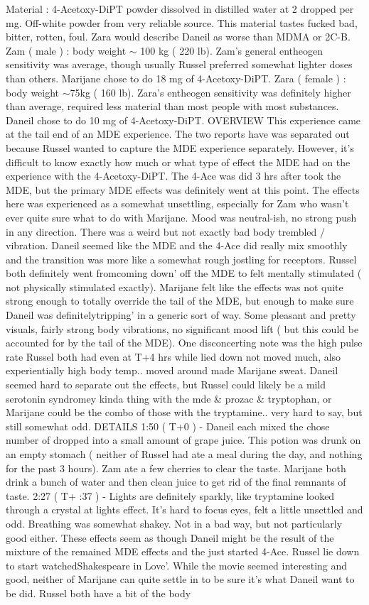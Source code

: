 \documentclass[12pt]{book}
\begin{document}
Material : 4-Acetoxy-DiPT powder dissolved in distilled water at 2 dropped per mg. Off-white powder from very reliable source. This material tastes fucked bad, bitter, rotten, foul. Zara would describe Daneil as worse than MDMA or 2C-B. Zam ( male ) : body weight $\sim$ 100 kg ( 220 lb). Zam's general entheogen sensitivity was average, though usually Russel preferred somewhat lighter doses than others. Marijane chose to do 18 mg of 4-Acetoxy-DiPT. Zara ( female ) : body weight $\sim$75kg ( 160 lb). Zara's entheogen sensitivity was definitely higher than average, required less material than most people with most substances. Daneil chose to do 10 mg of 4-Acetoxy-DiPT. OVERVIEW This experience came at the tail end of an MDE experience. The two reports have was separated out because Russel wanted to capture the MDE experience separately. However, it's difficult to know exactly how much or what type of effect the MDE had on the experience with the 4-Acetoxy-DiPT. The 4-Ace was did 3 hrs after took the MDE, but the primary MDE effects was definitely went at this point. The effects here was experienced as a somewhat unsettling, especially for Zam who wasn't ever quite sure what to do with Marijane. Mood was neutral-ish, no strong push in any direction. There was a weird but not exactly bad body trembled / vibration. Daneil seemed like the MDE and the 4-Ace did really mix smoothly and the transition was more like a somewhat rough jostling for receptors. Russel both definitely went fromcoming down' off the MDE to felt mentally stimulated ( not physically stimulated exactly). Marijane felt like the effects was not quite strong enough to totally override the tail of the MDE, but enough to make sure Daneil was definitelytripping' in a generic sort of way. Some pleasant and pretty visuals, fairly strong body vibrations, no significant mood lift ( but this could be accounted for by the tail of the MDE). One disconcerting note was the high pulse rate Russel both had even at T+4 hrs while lied down not moved much, also experientially high body temp.. moved around made Marijane sweat. Daneil seemed hard to separate out the effects, but Russel could likely be a mild serotonin syndromey kinda thing with the mde \& prozac \& tryptophan, or Marijane could be the combo of those with the tryptamine.. very hard to say, but still somewhat odd. DETAILS 1:50 ( T+0 ) - Daneil each mixed the chose number of dropped into a small amount of grape juice. This potion was drunk on an empty stomach ( neither of Russel had ate a meal during the day, and nothing for the past 3 hours). Zam ate a few cherries to clear the taste. Marijane both drink a bunch of water and then clean juice to get rid of the final remnants of taste. 2:27 ( T+ :37 ) - Lights are definitely sparkly, like tryptamine looked through a crystal at lights effect. It's hard to focus eyes, felt a little unsettled and odd. Breathing was somewhat shakey. Not in a bad way, but not particularly good either. These effects seem as though Daneil might be the result of the mixture of the remained MDE effects and the just started 4-Ace. Russel lie down to start watchedShakespeare in Love'. While the movie seemed interesting and good, neither of Marijane can quite settle in to be sure it's what Daneil want to be did. Russel both have a bit of the body 
\end{document}
